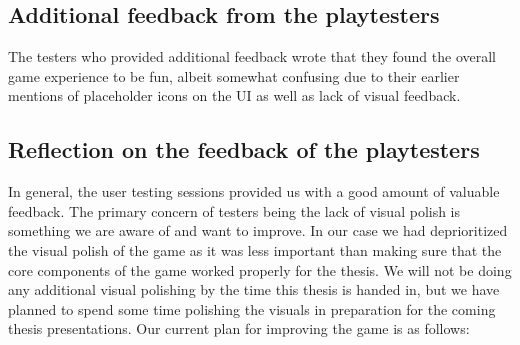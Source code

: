 \subsection{Additional feedback from the playtesters}
The testers who provided additional feedback wrote that they found the overall game experience to be fun, albeit somewhat confusing due to their earlier mentions of placeholder icons on the UI as well as lack of visual feedback. 
 
\subsection{Reflection on the feedback of the playtesters}
In general, the user testing sessions provided us with a good amount of valuable feedback. The primary concern of testers being the lack of visual polish is something we are aware of and want to improve. In our case we had deprioritized the visual polish of the game as it was less important than making sure that the core components of the game worked properly for the thesis. We will not be doing any additional visual polishing by the time this thesis is handed in, but we have planned to spend some time polishing the visuals in preparation for the coming thesis presentations. Our current plan for improving the game is as follows:

